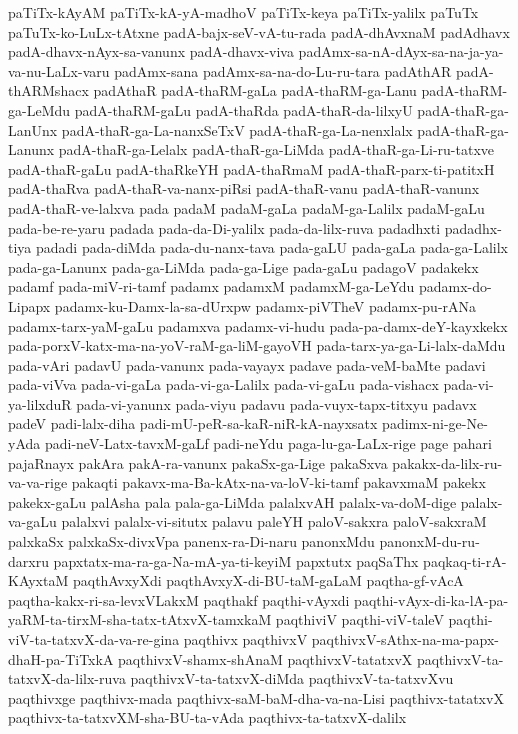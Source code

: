 {paTiTx-kAyAM
paTiTx-kA-yA-madhoV
paTiTx-keya
paTiTx-yalilx
paTuTx
paTuTx-ko-LuLx-tAtxne
padA-bajx-seV-vA-tu-rada
padA-dhAvxnaM
padAdhavx
padA-dhavx-nAyx-sa-vanunx
padA-dhavx-viva
padAmx-sa-nA-dAyx-sa-na-ja-ya-va-nu-LaLx-varu
padAmx-sana
padAmx-sa-na-do-Lu-ru-tara
padAthAR
padA-thARMshacx
padAthaR
padA-thaRM-gaLa
padA-thaRM-ga-Lanu
padA-thaRM-ga-LeMdu
padA-thaRM-gaLu
padA-thaRda
padA-thaR-da-lilxyU
padA-thaR-ga-LanUnx
padA-thaR-ga-La-nanxSeTxV
padA-thaR-ga-La-nenxlalx
padA-thaR-ga-Lanunx
padA-thaR-ga-Lelalx
padA-thaR-ga-LiMda
padA-thaR-ga-Li-ru-tatxve
padA-thaR-gaLu
padA-thaRkeYH
padA-thaRmaM
padA-thaR-parx-ti-patitxH
padA-thaRva
padA-thaR-va-nanx-piRsi
padA-thaR-vanu
padA-thaR-vanunx
padA-thaR-ve-lalxva
pada
padaM
padaM-gaLa
padaM-ga-Lalilx
padaM-gaLu
pada-be-re-yaru
padada
pada-da-Di-yalilx
pada-da-lilx-ruva
padadhxti
padadhx-tiya
padadi
pada-diMda
pada-du-nanx-tava
pada-gaLU
pada-gaLa
pada-ga-Lalilx
pada-ga-Lanunx
pada-ga-LiMda
pada-ga-Lige
pada-gaLu
padagoV
padakekx
padamf
pada-miV-ri-tamf
padamx
padamxM
padamxM-ga-LeYdu
padamx-do-Lipapx
padamx-ku-Damx-la-sa-dUrxpw
padamx-piVTheV
padamx-pu-rANa
padamx-tarx-yaM-gaLu
padamxva
padamx-vi-hudu
pada-pa-damx-deY-kayxkekx
pada-porxV-katx-ma-na-yoV-raM-ga-liM-gayoVH
pada-tarx-ya-ga-Li-lalx-daMdu
pada-vAri
padavU
pada-vanunx
pada-vayayx
padave
pada-veM-baMte
padavi
pada-viVva
pada-vi-gaLa
pada-vi-ga-Lalilx
pada-vi-gaLu
pada-vishacx
pada-vi-ya-lilxduR
pada-vi-yanunx
pada-viyu
padavu
pada-vuyx-tapx-titxyu
padavx
padeV
padi-lalx-diha
padi-mU-peR-sa-kaR-niR-kA-nayxsatx
padimx-ni-ge-Ne-yAda
padi-neV-Latx-tavxM-gaLf
padi-neYdu
paga-lu-ga-LaLx-rige
page
pahari
pajaRnayx
pakAra
pakA-ra-vanunx
pakaSx-ga-Lige
pakaSxva
pakakx-da-lilx-ru-va-va-rige
pakaqti
pakavx-ma-Ba-kAtx-na-va-loV-ki-tamf
pakavxmaM
pakekx
pakekx-gaLu
palAsha
pala
pala-ga-LiMda
palalxvAH
palalx-va-doM-dige
palalx-va-gaLu
palalxvi
palalx-vi-situtx
palavu
paleYH
paloV-sakxra
paloV-sakxraM
palxkaSx
palxkaSx-divxVpa
panenx-ra-Di-naru
panonxMdu
panonxM-du-ru-darxru
papxtatx-ma-ra-ga-Na-mA-ya-ti-keyiM
papxtutx
paqSaThx
paqkaq-ti-rA-KAyxtaM
paqthAvxyXdi
paqthAvxyX-di-BU-taM-gaLaM
paqtha-gf-vAcA
paqtha-kakx-ri-sa-levxVLakxM
paqthakf
paqthi-vAyxdi
paqthi-vAyx-di-ka-lA-pa-yaRM-ta-tirxM-sha-tatx-tAtxvX-tamxkaM
paqthiviV
paqthi-viV-taleV
paqthi-viV-ta-tatxvX-da-va-re-gina
paqthivx
paqthivxV
paqthivxV-sAthx-na-ma-papx-dhaH-pa-TiTxkA
paqthivxV-shamx-shAnaM
paqthivxV-tatatxvX
paqthivxV-ta-tatxvX-da-lilx-ruva
paqthivxV-ta-tatxvX-diMda
paqthivxV-ta-tatxvXvu
paqthivxge
paqthivx-mada
paqthivx-saM-baM-dha-va-na-Lisi
paqthivx-tatatxvX
paqthivx-ta-tatxvXM-sha-BU-ta-vAda
paqthivx-ta-tatxvX-dalilx
}
